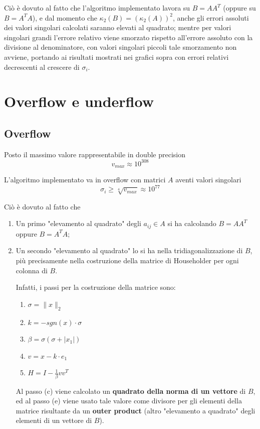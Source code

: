 Ciò è dovuto al fatto che l'algoritmo implementato lavora su $B = A A^T$ (oppure 
su $B = A^T A$), e dal momento che $\kappa_2(B) = (\kappa_2(A))^2$, anche gli 
errori assoluti dei valori singolari calcolati saranno elevati al quadrato; 
mentre per valori singolari grandi l'errore relativo viene smorzato rispetto 
all'errore assoluto con la divisione al denominatore, con valori singolari 
piccoli tale smorzamento non avviene, portando ai risultati mostrati nei grafici 
sopra con errori relativi decrescenti al crescere di $\sigma_i$.



\section{Overflow e underflow}
\subsection{Overflow}
Posto il massimo valore rappresentabile in double precision
\begin{equation*}
	v_{max} \approx 10^{308}
\end{equation*}

L'algoritmo implementato va in overflow con matrici $A$ aventi valori singolari
\begin{equation*}
	\sigma_i \geq \sqrt[4]{v_{max}} \approx 10^{77}
\end{equation*}

Ciò è dovuto al fatto che
\begin{enumerate}
	\item Un primo "elevamento al quadrato" degli $a_{ij} \in A$ si ha calcolando 
$B = A A^T$ oppure $B = A^T A$;
	\item Un secondo "elevamento al quadrato" lo si ha nella tridiagonalizzazione 
di $B$, più precisamente nella costruzione della matrice di Householder per ogni 
colonna di $B$.
	
	Infatti, i passi per la costruzione della matrice sono:
	\begin{enumerate}
		\item $\sigma = \| x \|_2$
		\item $k = -sgn(x) \cdot \sigma$
		\item $\beta = \sigma (\sigma + | x_1 |)$
		\item $v = x - k \cdot e_1$
		\item $H = I - \frac{1}{\beta}v v^T $
	\end{enumerate}
	
	Al passo (c) viene calcolato un \textbf{quadrato della norma di un vettore} di 
$B$, ed al passo (e) viene usato tale valore come divisore per gli elementi 
della matrice risultante da un \textbf{outer product} (altro "elevamento a 
quadrato" degli elementi di un vettore di $B$).
\end{enumerate}

